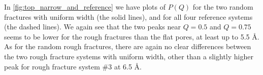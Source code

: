 In \cref{fig:top_narrow_and_reference} we have plots of $P(Q)$ for the two random fractures with uniform width (the solid lines), and for all four reference systems (the dashed lines). We again see that the two peaks near $Q = 0.5$ and $Q = 0.75$ seems to be lower for the rough fractures than the flat pores, at least up to 5.5 \AA. As for the random rough fractures, there are again no clear differences between the two rough fracture systems with uniform width, other than a slightly higher peak for rough fracture system \#3 at 6.5 \AA.

